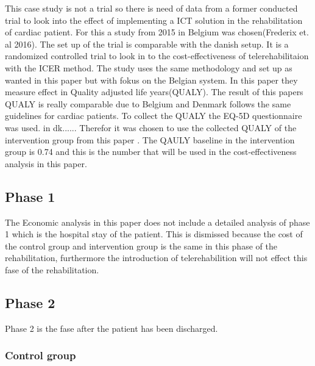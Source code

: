 This case study is not a trial so there is need of data from a former conducted trial to look into the effect of implementing a ICT solution in the rehabilitation of cardiac patient. For this a study from 2015 in Belgium was chosen(Frederix et. al 2016). The set up of the trial is comparable with the danish setup. It is a randomized controlled trial to look in to the cost-effectiveness of telerehabilitaion with the ICER method. The study uses the same methodology and set up as wanted in this paper but with fokus on the Belgian system. In this paper they measure effect in Quality adjusted life years(QUALY). The result of this papers QUALY is really comparable due to Belgium and Denmark follows the same guidelines for cardiac patients. To collect the QUALY the EQ-5D questionnaire was used. in dk......
Therefor it was chosen to use the collected QUALY of the intervention group from this paper \cite{costeffect}.
The QAULY baseline in the intervention group is 0.74 and this is the number that will be used in the cost-effectiveness analysis in this paper. 



\subsection{Phase 1}

The Economic analysis in this paper does not include a detailed analysis of phase 1 which is the hospital stay of the patient. This is dismissed because the cost of the control group and intervention group is the same in this phase of the rehabilitation, furthermore the introduction of telerehabilition will not effect this fase of the rehabilitation. 


\subsection{Phase 2}

Phase 2 is the fase after the patient has been discharged. 





\subsubsection{Control group}

